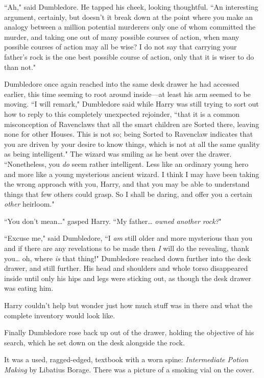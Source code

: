 ``Ah," said Dumbledore. He tapped his cheek, looking thoughtful. ``An interesting argument, certainly, but doesn't it break down at the point where you make an analogy between a million potential murderers only one of whom committed the murder, and taking one out of many possible courses of action, when many possible courses of action may all be wise? I do not say that carrying your father's rock is the one best possible course of action, only that it is wiser to do than not."

Dumbledore once again reached into the same desk drawer he had accessed earlier, this time seeming to root around inside—at least his arm seemed to be moving. ``I will remark," Dumbledore said while Harry was still trying to sort out how to reply to this completely unexpected rejoinder, ``that it is a common misconception of Ravenclaws that all the smart children are Sorted there, leaving none for other Houses. This is not so; being Sorted to Ravenclaw indicates that you are driven by your desire to know things, which is not at all the same quality as being intelligent." The wizard was smiling as he bent over the drawer. ``Nonetheless, you \emph{do} seem rather intelligent. Less like an ordinary young hero and more like a young mysterious ancient wizard. I think I may have been taking the wrong approach with you, Harry, and that you may be able to understand things that few others could grasp. So I shall be daring, and offer you a certain \emph{other} heirloom."

``You don't mean{\ldots}" gasped Harry. ``My father{\ldots} \emph{owned another rock?}"

``Excuse me," said Dumbledore, ``I \emph{am} still older and more mysterious than you and if there are any revelations to be made then \emph{I} will do the revealing, thank you{\ldots} oh, where \emph{is} that thing!" Dumbledore reached down further into the desk drawer, and still further. His head and shoulders and whole torso disappeared inside until only his hips and legs were sticking out, as though the desk drawer was eating him.

Harry couldn't help but wonder just how much stuff was in there and what the complete inventory would look like.

Finally Dumbledore rose back up out of the drawer, holding the objective of his search, which he set down on the desk alongside the rock.

It was a used, ragged-edged, textbook with a worn spine: \emph{Intermediate Potion Making} by Libatius Borage. There was a picture of a smoking vial on the cover.

